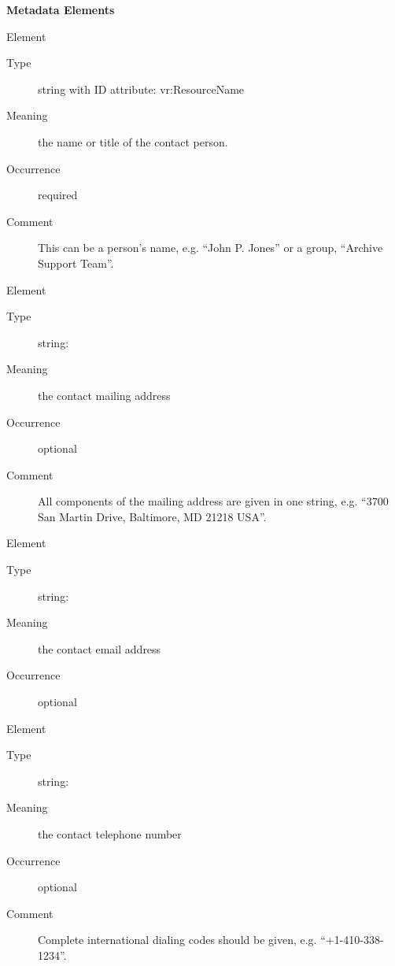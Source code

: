 \documentclass[11pt,a4paper]{ivoa}
\begin{document}
\begin{generated}
\vspace{0.5ex}\noindent\textbf{ Metadata Elements}

\begingroup\small\begin{bigdescription}\item[Element \xmlel{name}]
\begin{description}
\item[Type] string with ID attribute: vr:ResourceName
\item[Meaning] 
                  the name or title of the contact person.
              
\item[Occurrence] required
\item[Comment] 
                  This can be a person's name, e.g. “John P. Jones” or
                  a group, “Archive Support Team”.
              

\end{description}
\item[Element \xmlel{address}]
\begin{description}
\item[Type] string: 
\item[Meaning] the contact mailing address
\item[Occurrence] optional
\item[Comment] 
                All components of the mailing address are given in one
                string, e.g. “3700 San Martin Drive, Baltimore, MD 21218 USA”.
              

\end{description}
\item[Element \xmlel{email}]
\begin{description}
\item[Type] string: 
\item[Meaning] the contact email address
\item[Occurrence] optional

\end{description}
\item[Element \xmlel{telephone}]
\begin{description}
\item[Type] string: 
\item[Meaning] the contact telephone number
\item[Occurrence] optional
\item[Comment] 
                Complete international dialing codes should be given, e.g.
                “+1-410-338-1234”.
              

\end{description}


\end{bigdescription}\endgroup

\endgroup
\end{generated}
\end{document}

